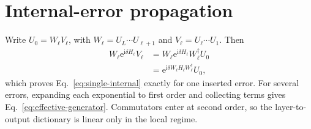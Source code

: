 \documentclass[aps,pra,reprint,amsmath,amssymb,superscriptaddress,longbibliography]{revtex4-2}
\newcommand{\ii}{\mathrm{i}}
\newcommand{\ee}{\mathrm{e}}
\begin{document}
\section{Internal-error propagation}
\label{app:internal-proof}

Write $U_0=W_\ell V_\ell$, with
$W_\ell=U_L\cdots U_{\ell+1}$ and
$V_\ell=U_\ell\cdots U_1$.  Then
\begin{align}
 W_\ell\ee^{\ii\delta H_\ell}V_\ell
 &=
 W_\ell\ee^{\ii\delta H_\ell}W_\ell^\dagger U_0\nonumber\\
 &=\ee^{\ii\delta W_\ell H_\ell W_\ell^\dagger}U_0,
\end{align}
which proves Eq.~\eqref{eq:single-internal} exactly for one inserted error.
For several errors, expanding each exponential to first order and collecting
terms gives Eq.~\eqref{eq:effective-generator}.  Commutators enter at second
order, so the layer-to-output dictionary is linear only in the local regime.


\end{document}
